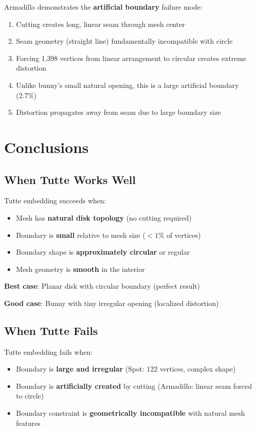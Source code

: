 \documentclass[11pt]{article}
\begin{document}
Armadillo demonstrates the \textbf{artificial boundary} failure mode:

\begin{enumerate}
    \item Cutting creates long, linear seam through mesh center
    \item Seam geometry (straight line) fundamentally incompatible with circle
    \item Forcing 1,398 vertices from linear arrangement to circular creates extreme distortion
    \item Unlike bunny's small natural opening, this is a large artificial boundary (2.7\%)
    \item Distortion propagates away from seam due to large boundary size
\end{enumerate}

\section{Conclusions}

\subsection{When Tutte Works Well}

Tutte embedding succeeds when:
\begin{itemize}
    \item Mesh has \textbf{natural disk topology} (no cutting required)
    \item Boundary is \textbf{small} relative to mesh size ($<1\%$ of vertices)
    \item Boundary shape is \textbf{approximately circular} or regular
    \item Mesh geometry is \textbf{smooth} in the interior
\end{itemize}

\textbf{Best case}: Planar disk with circular boundary (perfect result)

\textbf{Good case}: Bunny with tiny irregular opening (localized distortion)

\subsection{When Tutte Fails}

Tutte embedding fails when:
\begin{itemize}
    \item Boundary is \textbf{large and irregular} (Spot: 122 vertices, complex shape)
    \item Boundary is \textbf{artificially created} by cutting (Armadillo: linear seam forced to circle)
    \item Boundary constraint is \textbf{geometrically incompatible} with natural mesh features
\end{itemize}
\end{document}
